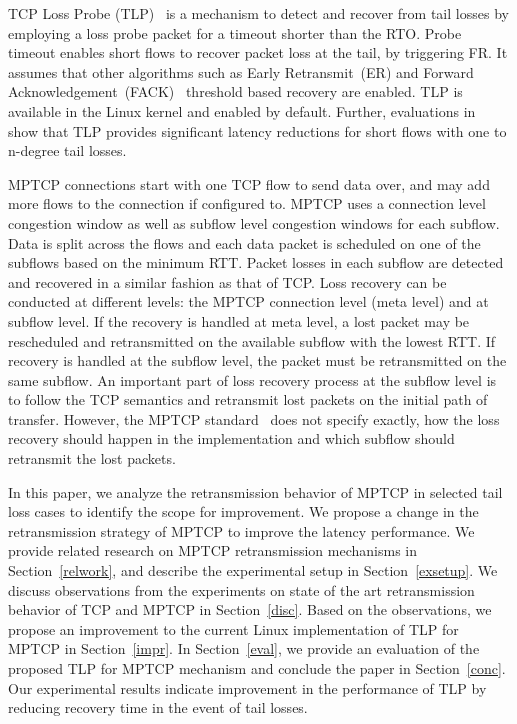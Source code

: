 \documentclass[10pt,conference]{IEEEtran}
\begin{document}
TCP Loss Probe (TLP)~\cite{Flach:2013} is a mechanism to detect and recover from tail losses by employing a loss probe packet for a timeout shorter
than the RTO. Probe timeout enables short flows to recover packet loss at the tail, by triggering FR. It assumes that other algorithms such as 
Early Retransmit~(ER)\cite{rfc5827} and Forward Acknowledgement~(FACK)~\cite{FACK} threshold based recovery are enabled. TLP is available in the Linux 
kernel and enabled by default. Further, evaluations in~\cite{Rajiullah:2015} show that TLP provides significant latency reductions for short 
flows with one to n-degree tail losses. 

 MPTCP connections start with one TCP flow to send data over, and may add more flows to the connection if configured to. MPTCP uses a connection 
 level congestion window as well as subflow level congestion windows for each subflow. Data is split across the flows and each data packet is 
 scheduled on one of the subflows based on the minimum RTT. Packet losses in each subflow are detected and recovered in a similar fashion as that of 
 TCP. Loss recovery can be conducted at different levels: the MPTCP connection level (meta level) and at subflow level. If the recovery is handled 
 at meta level, a lost packet may be rescheduled and retransmitted on the available subflow with the lowest RTT. If recovery is handled at the 
 subflow level, the packet must be retransmitted on the same subflow. An important part of loss recovery process at the subflow level is to follow 
 the TCP semantics and retransmit lost packets on the initial path of transfer. However, the MPTCP standard~\cite{rfc6824} does not specify exactly, 
 how the loss recovery should happen in the implementation and which subflow should retransmit the lost packets.


In this paper, we analyze the retransmission behavior of MPTCP in selected tail loss cases to identify the scope for improvement. We propose a 
change in the retransmission strategy of MPTCP to improve the latency performance. We provide related research on MPTCP retransmission mechanisms in 
Section~\ref{relwork}, and describe the experimental setup in Section~\ref{exsetup}. We discuss observations from the experiments on state 
of the art retransmission behavior of TCP and MPTCP in Section~\ref{disc}. Based on the observations, we propose an improvement to the current 
Linux implementation of TLP for MPTCP in Section~\ref{impr}. In Section~\ref{eval}, we provide an evaluation of the proposed TLP for MPTCP 
mechanism and conclude the paper in Section~\ref{conc}. Our experimental results indicate improvement in the performance of TLP by reducing 
recovery time in the event of tail losses.
 
\end{document}
